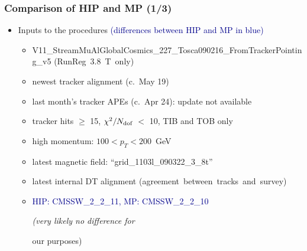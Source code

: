 \documentclass[compress]{beamer}
\begin{document}
\begin{frame}
\frametitle{Comparison of HIP and MP (1/3)}
\begin{itemize}
\item Inputs to the procedures \textcolor{darkblue}{\scriptsize (differences between HIP and MP in blue)}
\begin{itemize}\setlength{\itemsep}{0.1 cm}\scriptsize
\item {\tiny V11\_StreamMuAlGlobalCosmics\_227\_Tosca090216\_FromTrackerPointing\_v5} \mbox{(RunReg 3.8~T only)\hspace{-1 cm}}
\item newest tracker alignment (c.~May 19)
\item last month's tracker APEs (c.~Apr 24): update not available
\item tracker hits $\ge$ 15, $\chi^2/N_{\mbox{\scriptsize dof}}$ $<$ 10, TIB and TOB only
\item high momentum: $100 < p_T < 200$~GeV
\item latest magnetic field: ``grid\_1103l\_090322\_3\_8t''
\item latest internal DT alignment \mbox{(agreement between tracks and survey)\hspace{-1 cm}}
\item \textcolor{darkblue}{HIP: CMSSW\_2\_2\_11, MP: CMSSW\_2\_2\_10} {\it (very likely no difference for

\hfill our purposes)}
\end{itemize}
\end{itemize}


\end{frame}
\end{document}
